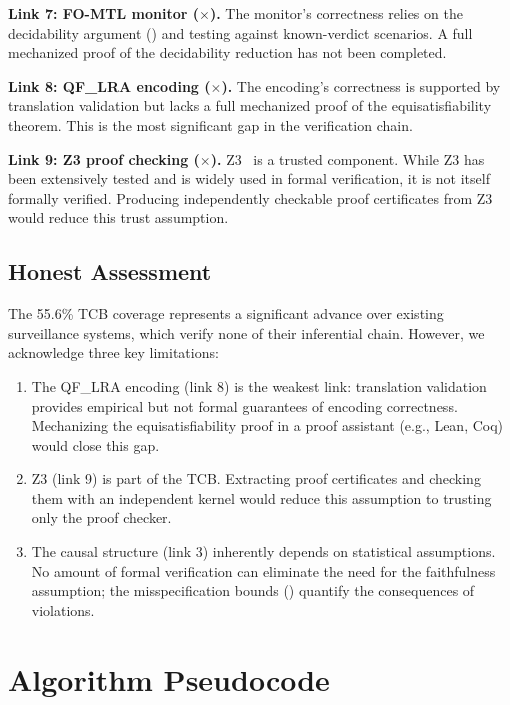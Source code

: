 \documentclass[11pt]{article}
\begin{document}
\textbf{Link 7: FO-MTL monitor ($\times$).}
The monitor's correctness relies on the decidability argument () and testing against known-verdict scenarios.
A full mechanized proof of the decidability reduction has not been completed.

\textbf{Link 8: QF\_LRA encoding ($\times$).}
The encoding's correctness is supported by translation validation but lacks a full mechanized proof of the equisatisfiability theorem.
This is the most significant gap in the verification chain.

\textbf{Link 9: Z3 proof checking ($\times$).}
Z3~\cite{demoura2008} is a trusted component.
While Z3 has been extensively tested and is widely used in formal verification, it is not itself formally verified.
Producing independently checkable proof certificates from Z3 would reduce this trust assumption.

\subsection{Honest Assessment}

The 55.6\% TCB coverage represents a significant advance over existing surveillance systems, which verify none of their inferential chain.
However, we acknowledge three key limitations:

\begin{enumerate}[nosep]
  \item The QF\_LRA encoding (link 8) is the weakest link: translation validation provides empirical but not formal guarantees of encoding correctness.
  Mechanizing the equisatisfiability proof in a proof assistant (e.g., Lean, Coq) would close this gap.

  \item Z3 (link 9) is part of the TCB.
  Extracting proof certificates and checking them with an independent kernel would reduce this assumption to trusting only the proof checker.

  \item The causal structure (link 3) inherently depends on statistical assumptions.
  No amount of formal verification can eliminate the need for the faithfulness assumption; the misspecification bounds () quantify the consequences of violations.
\end{enumerate}

\section{Algorithm Pseudocode}
\label{app:algorithms}
\end{document}
